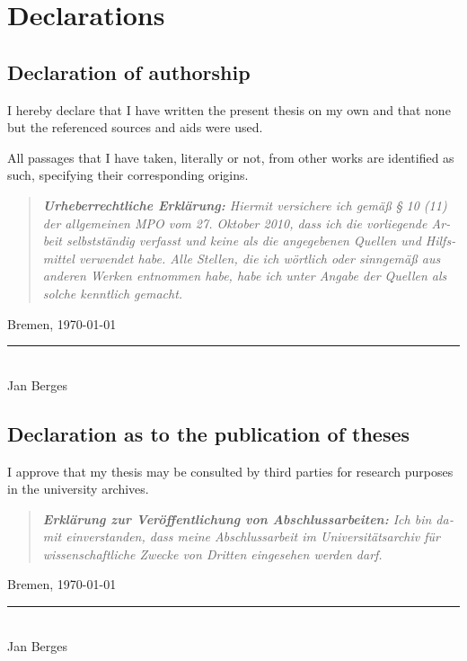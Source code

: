 
\chapter{Declarations}

\section*{Declaration of authorship}

I hereby declare that I have written the present thesis on my own and that none
but the referenced sources and aids were used.

All passages that I have taken, literally or not, from other works are
identified as such, specifying their corresponding origins.

\begin{otherlanguage}{ngerman}
    \begin{quote}
        \small \itshape
        \textbf{Urheberrechtliche Erklärung:}
        Hiermit versichere ich gemäß § 10 (11) der allgemeinen MPO vom 27.
        Oktober 2010, dass ich die vorliegende Arbeit selbstständig verfasst und
        keine als die angegebenen Quellen und Hilfsmittel verwendet habe.
        Alle Stellen, die ich wörtlich oder sinngemäß aus anderen Werken
        entnommen habe, habe ich unter Angabe der Quellen als solche kenntlich
        gemacht.
    \end{quote}
\end{otherlanguage}

Bremen, \today

\begin{flushright}
    \rule{3cm}{0.5pt} \\
    Jan Berges \\
\end{flushright}

\section*{Declaration as to the publication of theses}

I approve that my thesis may be consulted by third parties for research purposes
in the university archives.

\begin{otherlanguage}{ngerman}
    \begin{quote}
        \small \itshape
        \textbf{Erklärung zur Veröffentlichung von Abschlussarbeiten:}
        Ich bin damit einverstanden, dass meine Abschlussarbeit im
        Universitätsarchiv für wissenschaftliche Zwecke von Dritten eingesehen
        werden darf.
    \end{quote}
\end{otherlanguage}

Bremen, \today

\begin{flushright}
    \rule{3cm}{0.5pt} \\
    Jan Berges
\end{flushright}
